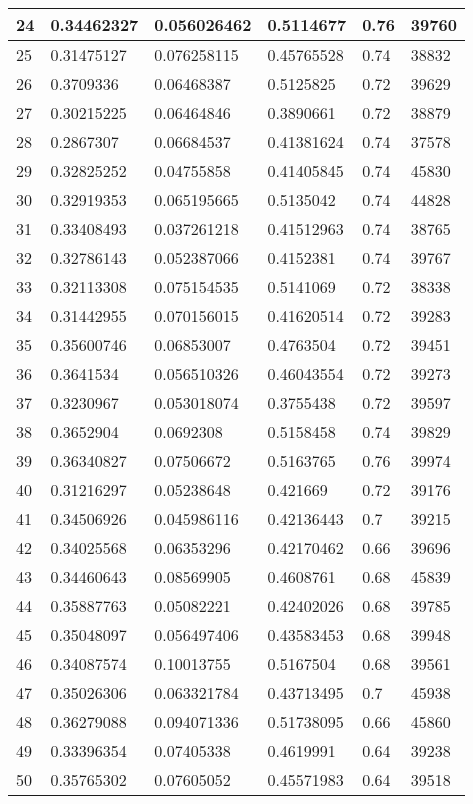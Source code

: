 \begin{longtable}{|l|l|l|l|l|l|}
24 & 0.34462327 & 0.056026462 & 0.5114677 & 0.76 & 39760 \\ \hline 
25 & 0.31475127 & 0.076258115 & 0.45765528 & 0.74 & 38832 \\ \hline 
26 & 0.3709336 & 0.06468387 & 0.5125825 & 0.72 & 39629 \\ \hline 
27 & 0.30215225 & 0.06464846 & 0.3890661 & 0.72 & 38879 \\ \hline 
28 & 0.2867307 & 0.06684537 & 0.41381624 & 0.74 & 37578 \\ \hline 
29 & 0.32825252 & 0.04755858 & 0.41405845 & 0.74 & 45830 \\ \hline 
30 & 0.32919353 & 0.065195665 & 0.5135042 & 0.74 & 44828 \\ \hline 
31 & 0.33408493 & 0.037261218 & 0.41512963 & 0.74 & 38765 \\ \hline 
32 & 0.32786143 & 0.052387066 & 0.4152381 & 0.74 & 39767 \\ \hline 
33 & 0.32113308 & 0.075154535 & 0.5141069 & 0.72 & 38338 \\ \hline 
34 & 0.31442955 & 0.070156015 & 0.41620514 & 0.72 & 39283 \\ \hline 
35 & 0.35600746 & 0.06853007 & 0.4763504 & 0.72 & 39451 \\ \hline 
36 & 0.3641534 & 0.056510326 & 0.46043554 & 0.72 & 39273 \\ \hline 
37 & 0.3230967 & 0.053018074 & 0.3755438 & 0.72 & 39597 \\ \hline 
38 & 0.3652904 & 0.0692308 & 0.5158458 & 0.74 & 39829 \\ \hline 
39 & 0.36340827 & 0.07506672 & 0.5163765 & 0.76 & 39974 \\ \hline 
40 & 0.31216297 & 0.05238648 & 0.421669 & 0.72 & 39176 \\ \hline 
41 & 0.34506926 & 0.045986116 & 0.42136443 & 0.7 & 39215 \\ \hline 
42 & 0.34025568 & 0.06353296 & 0.42170462 & 0.66 & 39696 \\ \hline 
43 & 0.34460643 & 0.08569905 & 0.4608761 & 0.68 & 45839 \\ \hline 
44 & 0.35887763 & 0.05082221 & 0.42402026 & 0.68 & 39785 \\ \hline 
45 & 0.35048097 & 0.056497406 & 0.43583453 & 0.68 & 39948 \\ \hline 
46 & 0.34087574 & 0.10013755 & 0.5167504 & 0.68 & 39561 \\ \hline 
47 & 0.35026306 & 0.063321784 & 0.43713495 & 0.7 & 45938 \\ \hline 
48 & 0.36279088 & 0.094071336 & 0.51738095 & 0.66 & 45860 \\ \hline 
49 & 0.33396354 & 0.07405338 & 0.4619991 & 0.64 & 39238 \\ \hline 
50 & 0.35765302 & 0.07605052 & 0.45571983 & 0.64 & 39518 \\ \hline 
\end{longtable}